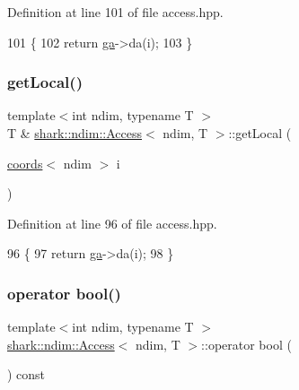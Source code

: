 Definition at line 101 of file access.\+hpp.


\begin{DoxyCode}
101                                                                      \{
102             \textcolor{keywordflow}{return} \hyperlink{classshark_1_1ndim_1_1_access_abc59e261a07fcecc3f1db641ef04efa7}{ga}->da(i);
103         \}
\end{DoxyCode}
\hypertarget{classshark_1_1ndim_1_1_access_a8fe86487f1b5a1b5af26798665cb09b8}{}\label{classshark_1_1ndim_1_1_access_a8fe86487f1b5a1b5af26798665cb09b8} 
\subsubsection{\texorpdfstring{get\+Local()}{getLocal()}\hspace{0.1cm}{\footnotesize\ttfamily [2/2]}}
{\footnotesize\ttfamily template$<$int ndim, typename T $>$ \\
T \& \hyperlink{classshark_1_1ndim_1_1_access}{shark\+::ndim\+::\+Access}$<$ ndim, T $>$\+::get\+Local (\begin{DoxyParamCaption}\item[{\hyperlink{structshark_1_1ndim_1_1coords}{coords}$<$ ndim $>$}]{i }\end{DoxyParamCaption})\hspace{0.3cm}{\ttfamily [inline]}}



Definition at line 96 of file access.\+hpp.


\begin{DoxyCode}
96                                                          \{
97             \textcolor{keywordflow}{return} \hyperlink{classshark_1_1ndim_1_1_access_abc59e261a07fcecc3f1db641ef04efa7}{ga}->da(i);
98         \}
\end{DoxyCode}
\hypertarget{classshark_1_1ndim_1_1_access_af1f5644abd12d6affaf5f52db26ce512}{}\label{classshark_1_1ndim_1_1_access_af1f5644abd12d6affaf5f52db26ce512} 
\subsubsection{\texorpdfstring{operator bool()}{operator bool()}}
{\footnotesize\ttfamily template$<$int ndim, typename T $>$ \\
\hyperlink{classshark_1_1ndim_1_1_access}{shark\+::ndim\+::\+Access}$<$ ndim, T $>$\+::operator bool (\begin{DoxyParamCaption}{ }\end{DoxyParamCaption}) const\hspace{0.3cm}{\ttfamily [inline]}}

